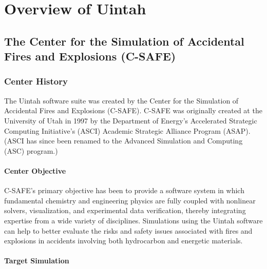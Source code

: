 \chapter{Overview of Uintah} \label{Sec:Overview} 

\section{The Center for the Simulation of Accidental Fires and Explosions (C-SAFE)}

\subsection{Center History}

The Uintah software suite was created by the Center for the Simulation
of Accidental Fires and Explosions (C-SAFE).  C-SAFE was originally
created at the University of Utah in 1997 by the Department of
Energy's Accelerated Strategic Computing Initiative's (ASCI) Academic
Strategic Alliance Program (ASAP).  (ASCI has since been renamed to
the Advanced Simulation and Computing (ASC) program.)

\subsubsection{Center Objective}

C-SAFE's primary objective has been to provide a software system in
which fundamental chemistry and engineering physics are fully coupled
with nonlinear solvers, visualization, and experimental data
verification, thereby integrating expertise from a wide variety of
disciplines. Simulations using the Uintah software can help to better
evaluate the risks and safety issues associated with fires and
explosions in accidents involving both hydrocarbon and energetic
materials.

\subsubsection{Target Simulation}


